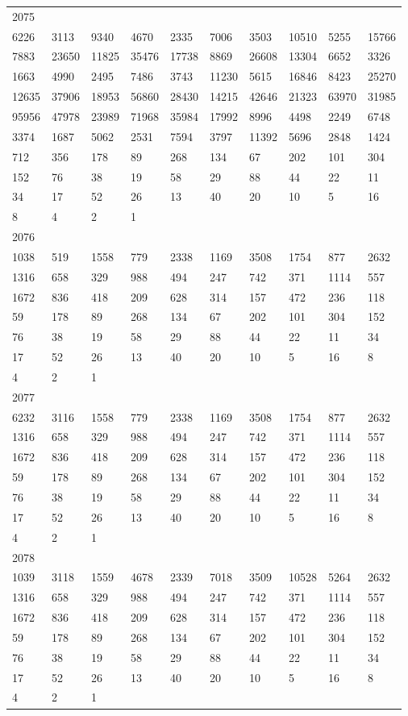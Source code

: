 \begin{longtable}{*{10}{l}}
2075&&&&&&&&&\\
6226& 3113& 9340& 4670& 2335& 7006& 3503& 10510& 5255& 15766\\
7883& 23650& 11825& 35476& 17738& 8869& 26608& 13304& 6652& 3326\\
1663& 4990& 2495& 7486& 3743& 11230& 5615& 16846& 8423& 25270\\
12635& 37906& 18953& 56860& 28430& 14215& 42646& 21323& 63970& 31985\\
95956& 47978& 23989& 71968& 35984& 17992& 8996& 4498& 2249& 6748\\
3374& 1687& 5062& 2531& 7594& 3797& 11392& 5696& 2848& 1424\\
712& 356& 178& 89& 268& 134& 67& 202& 101& 304\\
152& 76& 38& 19& 58& 29& 88& 44& 22& 11\\
34& 17& 52& 26& 13& 40& 20& 10& 5& 16\\
8& 4& 2& 1& \\

2076&&&&&&&&&\\
1038& 519& 1558& 779& 2338& 1169& 3508& 1754& 877& 2632\\
1316& 658& 329& 988& 494& 247& 742& 371& 1114& 557\\
1672& 836& 418& 209& 628& 314& 157& 472& 236& 118\\
59& 178& 89& 268& 134& 67& 202& 101& 304& 152\\
76& 38& 19& 58& 29& 88& 44& 22& 11& 34\\
17& 52& 26& 13& 40& 20& 10& 5& 16& 8\\
4& 2& 1& \\

2077&&&&&&&&&\\
6232& 3116& 1558& 779& 2338& 1169& 3508& 1754& 877& 2632\\
1316& 658& 329& 988& 494& 247& 742& 371& 1114& 557\\
1672& 836& 418& 209& 628& 314& 157& 472& 236& 118\\
59& 178& 89& 268& 134& 67& 202& 101& 304& 152\\
76& 38& 19& 58& 29& 88& 44& 22& 11& 34\\
17& 52& 26& 13& 40& 20& 10& 5& 16& 8\\
4& 2& 1& \\

2078&&&&&&&&&\\
1039& 3118& 1559& 4678& 2339& 7018& 3509& 10528& 5264& 2632\\
1316& 658& 329& 988& 494& 247& 742& 371& 1114& 557\\
1672& 836& 418& 209& 628& 314& 157& 472& 236& 118\\
59& 178& 89& 268& 134& 67& 202& 101& 304& 152\\
76& 38& 19& 58& 29& 88& 44& 22& 11& 34\\
17& 52& 26& 13& 40& 20& 10& 5& 16& 8\\
4& 2& 1& \\


\end{longtable}
